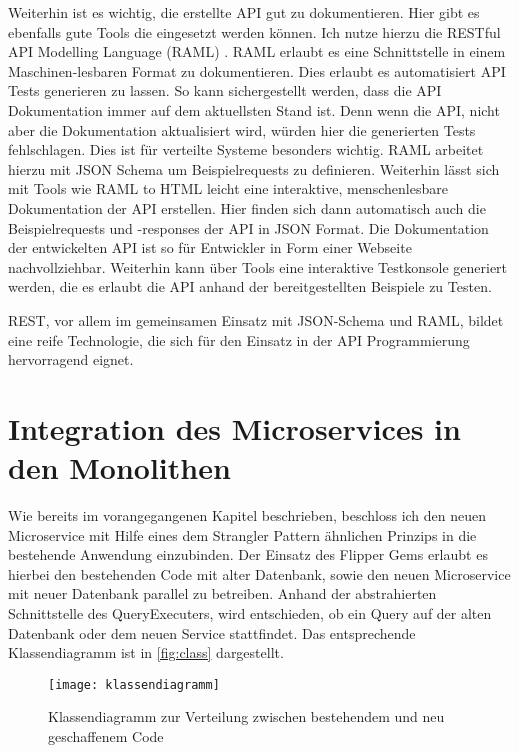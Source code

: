 Weiterhin ist es wichtig, die erstellte API gut zu dokumentieren. Hier gibt es ebenfalls gute Tools die eingesetzt werden können. Ich nutze hierzu die RESTful API Modelling Language (RAML) \cite{raml}. RAML erlaubt es eine Schnittstelle in einem Maschinen-lesbaren Format zu dokumentieren. Dies erlaubt es automatisiert API Tests generieren zu lassen. So kann sichergestellt werden, dass die API Dokumentation immer auf dem aktuellsten Stand ist. Denn wenn die API, nicht aber die Dokumentation aktualisiert wird, würden hier die generierten Tests fehlschlagen. Dies ist für verteilte Systeme besonders wichtig. RAML arbeitet hierzu mit JSON Schema um Beispielrequests zu definieren. Weiterhin lässt sich mit Tools wie RAML to HTML \cite{raml2html} leicht eine interaktive, menschenlesbare Dokumentation der API erstellen. Hier finden sich dann automatisch auch die Beispielrequests und -responses der API in JSON Format. Die Dokumentation der entwickelten API ist so für Entwickler in Form einer Webseite \cite{prophetdoku} nachvollziehbar. 
Weiterhin kann über Tools \cite{ramlconsoletool} eine interaktive Testkonsole generiert werden, die es erlaubt die API anhand der bereitgestellten Beispiele zu Testen.

REST, vor allem im gemeinsamen Einsatz mit JSON-Schema und RAML, bildet eine reife Technologie, die sich für den Einsatz in der API Programmierung hervorragend eignet.


\section{Integration des Microservices in den Monolithen}
Wie bereits im vorangegangenen Kapitel beschrieben, beschloss ich den neuen Microservice mit Hilfe eines dem Strangler Pattern ähnlichen Prinzips in die bestehende Anwendung einzubinden.
Der Einsatz des Flipper Gems erlaubt es hierbei den bestehenden Code mit alter Datenbank, sowie den neuen Microservice mit neuer Datenbank parallel zu betreiben. Anhand der abstrahierten Schnittstelle des QueryExecuters, wird entschieden, ob ein Query auf der alten Datenbank oder dem neuen Service stattfindet. Das entsprechende Klassendiagramm ist in \autoref{fig:class} dargestellt.
\begin{figure}[!ht]
    \centering
    \caption{Klassendiagramm zur Verteilung zwischen bestehendem und neu geschaffenem Code}
    \label{fig:class}
    \texttt{[image: klassendiagramm]}
\end{figure}

